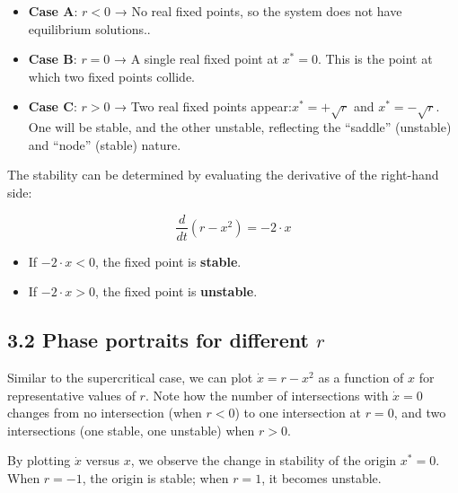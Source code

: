 \documentclass[
]{article}
\providecommand{\tightlist}{%
  \setlength{\itemsep}{0pt}\setlength{\parskip}{0pt}}
\begin{document}
\begin{itemize}
\tightlist
\item
  \textbf{Case A}: \(r < 0\) → No real fixed points, so the system does
  not have equilibrium solutions..
\item
  \textbf{Case B}: \(r = 0\) → A single real fixed point at \(x^*=0\).
  This is the point at which two fixed points collide.
\item
  \textbf{Case C}: \(r > 0\) → Two real fixed points
  appear:\(x^*= + \sqrt{r}\) and \(x^*= - \sqrt{r}\). One will be
  stable, and the other unstable, reflecting the ``saddle'' (unstable)
  and ``node'' (stable) nature.
\end{itemize}

The stability can be determined by evaluating the derivative of the
right-hand side:

\[
\frac{d }{dt}(r-x^2)=-2\cdot x
\]

\begin{itemize}
\item
  If \textbf{\(-2\cdot x<0\)}, the fixed point is \textbf{stable}.
\item
  If \textbf{\(-2\cdot x>0\)}, the fixed point is \textbf{unstable}.
\end{itemize}

\subsection{\texorpdfstring{\textbf{3.2 Phase portraits for different
\(r\)}}{3.2 Phase portraits for different r}}\label{phase-portraits-for-different-r-1}

Similar to the supercritical case, we can plot \(\dot{x} = r  - x^2\) as
a function of \(x\) for representative values of \(r\). Note how the
number of intersections with \(\dot{x} =0\) changes from no intersection
(when \(r < 0\)) to one intersection at \(r = 0\), and two intersections
(one stable, one unstable) when \(r > 0\).

By plotting \(\dot{x}\) versus \(x\), we observe the change in stability
of the origin \(x^* = 0\). When \(r = -1\), the origin is stable; when
\(r = 1\), it becomes unstable.
\end{document}
